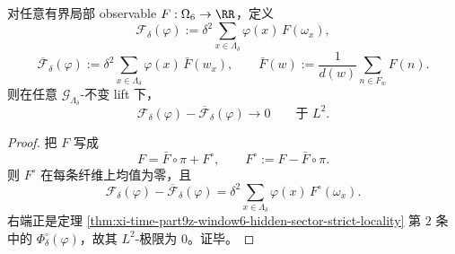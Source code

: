 \begin{corollary}[面积型配对下抬升观测量的塌缩]\label{cor:xi-time-part9za-window6-area-pairing-lifted-collapse}
对任意有界局部 observable \(F:\Omega_6\to\RR\)，定义
\[
\mathcal F_\delta(\varphi)
:=
\delta^2\sum_{x\in\Lambda_\delta}\varphi(x)\,F(\omega_x),
\]
\[
\overline{\mathcal F}_\delta(\varphi)
:=
\delta^2\sum_{x\in\Lambda_\delta}\varphi(x)\,\bar F(w_x),
\qquad
\bar F(w):=\frac1{d(w)}\sum_{n\in F_w}F(n).
\]
则在任意 \(\mathcal G_{\Lambda_\delta}\)-不变 lift 下，
\[
\mathcal F_\delta(\varphi)-\overline{\mathcal F}_\delta(\varphi)\longrightarrow 0
\qquad\text{于 }L^2.
\]
\end{corollary}
\begin{proof}
把 \(F\) 写成
\[
F=\bar F\circ \pi+F^\circ,
\qquad
F^\circ:=F-\bar F\circ \pi.
\]
则 \(F^\circ\) 在每条纤维上均值为零，且
\[
\mathcal F_\delta(\varphi)-\overline{\mathcal F}_\delta(\varphi)
=
\delta^2\sum_{x\in\Lambda_\delta}\varphi(x)\,F^\circ(\omega_x).
\]
右端正是定理 \ref{thm:xi-time-part9z-window6-hidden-sector-strict-locality} 第 \(2\) 条中的 \(\Phi_\delta^\circ(\varphi)\)，故其 \(L^2\)-极限为 \(0\)。证毕。
\end{proof}

